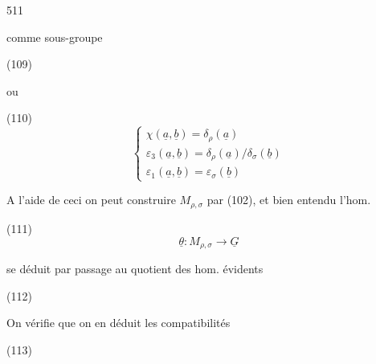 \begin{enumerate}
\newpage


511

comme sous-groupe

(109)

ou

(110)
$$
\begin{cases}
\chi(\underline{a}, \underline{b}) = \delta_\rho(\underline{a}) \\
\varepsilon_3(\underline{a}, \underline{b}) = \delta_\rho(\underline{a}) / \delta_\sigma(\underline{b}) \\
\varepsilon_1(\underline{a}, \underline{b}) = \varepsilon_\sigma(\underline{b})
\end{cases}
$$

A l'aide de ceci on peut construire $M_{\rho, \sigma}$
par (102), et bien entendu l'hom.

(111) $$ \underline{\theta} : M_{\rho, \sigma} \longrightarrow \underline{G} $$

se déduit par passage au quotient des hom.
évidents

(112)

On vérifie que on en déduit les compatibilités

(113)


\end{enumerate}
